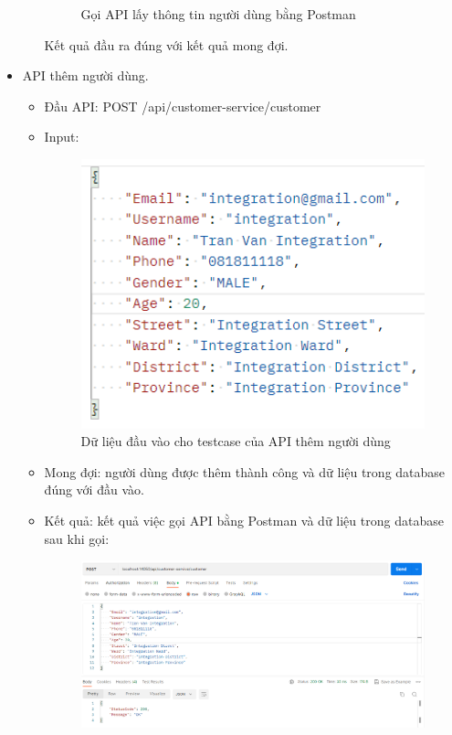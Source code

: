 \begin{itemize}
\begin{itemize}
\begin{figure}[!htp]
\begin{center}
            \end{center}
            \caption{Gọi API lấy thông tin người dùng bằng Postman}
        \end{figure}
        Kết quả đầu ra đúng với kết quả mong đợi.
    \end{itemize}
    \item API thêm người dùng.
    \begin{itemize}
        \item Đầu API: POST /api/customer-service/customer
        \item Input:
        \begin{figure}[!htp]
            \begin{center}
                \includegraphics[width=10cm]{img/testing/inte_input_2.PNG}
            \end{center}
            \caption{Dữ liệu đầu vào cho testcase của API thêm người dùng}
        \end{figure}
        \item Mong đợi: người dùng được thêm thành công và dữ liệu trong database đúng với đầu vào.
        \item Kết quả: kết quả việc gọi API bằng Postman và dữ liệu trong database sau khi gọi:\\
        \newpage
        \begin{figure}[!htp]
            \begin{center}
                \includegraphics[width=15cm]{img/testing/inte_got_2.PNG}

\end{center}
\end{figure}
\end{itemize}
\end{itemize}
